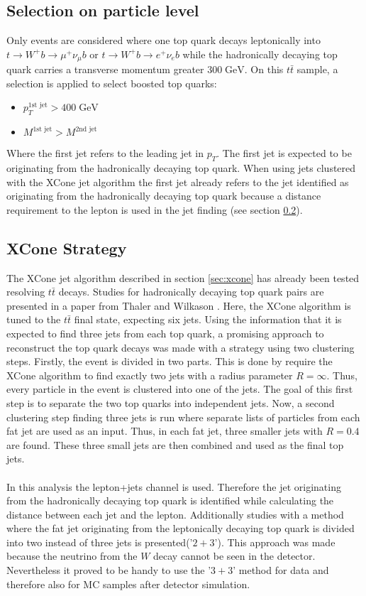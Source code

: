 \subsection{Selection on particle level}
\label{sec:GenSel}
	Only events are considered where one top quark decays leptonically into $t\rightarrow W^{+} b\rightarrow \mu^{+} \nu_{\mu} b$ or $t\rightarrow W^{+} b\rightarrow e^{+} \nu_e b$ while the hadronically decaying top quark carries a transverse momentum greater $300\;\text{GeV}$. On this $t\bar{t}$ sample, a selection is applied to select boosted top quarks:
	\begin{itemize}
	\item $p_T^{\text{1st jet}} > 400\;\text{GeV}$ 
	\item $M^{\text{1st jet}} > M^{\text{2nd jet}}$
	\end{itemize}
	Where the first jet refers to the leading jet in $p_T$. The first jet is expected to be originating from the hadronically decaying top quark. When using jets clustered with the XCone jet algorithm the first jet already refers to the jet identified as originating from the hadronically decaying top quark because a distance requirement to the lepton is used in the jet finding (see section \ref{sec:XCone_strat}).
	
\subsection{XCone Strategy}
\label{sec:XCone_strat}
	The XCone jet algorithm described in section \ref{sec:xcone} has already been tested resolving $t\bar{t}$ decays. Studies for hadronically decaying top quark pairs are presented in a paper from Thaler and Wilkason \cite{xconetop}. Here, the XCone algorithm is tuned to the $t\bar{t}$ final state, expecting six jets. Using the information that it is expected to find three jets from each top quark, a promising approach to reconstruct the top quark decays was made with a strategy using two clustering steps. Firstly, the event is divided in two parts. This is done by require the XCone algorithm to find exactly two jets with a radius parameter $R=\infty$. Thus, every particle in the event is clustered into one of the jets. The goal of this first step is to separate the two top quarks into independent jets. Now, a second clustering step finding three jets is run where separate lists of particles from each fat jet are used as an input. Thus, in each fat jet, three smaller jets with $R=0.4$ are found. These three small jets are then combined and used as the final top jets. \\
	\\ In this analysis the lepton+jets channel is used. Therefore the jet originating from the hadronically decaying top quark is identified while calculating the distance between each jet and the lepton. Additionally studies with a method where the fat jet originating from the leptonically decaying top quark is divided into two instead of three jets is presented('$2+3$'). This approach was made because the neutrino from the $W$ decay cannot be seen in the detector. Nevertheless it proved to be handy to use the '$3+3$' method for data and therefore also for MC samples after detector simulation.   

